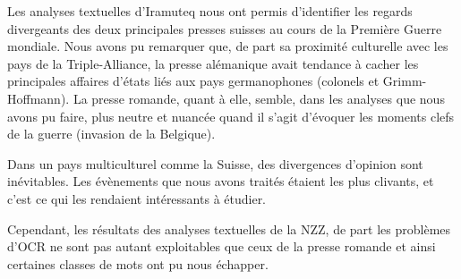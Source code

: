 \documentclass[french,a4paper]{article}
\begin{document}
Les analyses textuelles d'Iramuteq nous ont permis d'identifier les regards divergeants des deux principales presses suisses au cours de la Première Guerre mondiale.
Nous avons pu remarquer que, de part sa proximité culturelle avec les pays de la Triple-Alliance, la presse alémanique avait tendance à cacher les principales affaires d'états liés aux pays germanophones (colonels et Grimm-Hoffmann).
La presse romande, quant à elle, semble, dans les analyses que nous avons pu faire, plus neutre et nuancée quand il s'agit d'évoquer les moments clefs de la guerre (invasion de la Belgique).

Dans un pays multiculturel comme la Suisse, des divergences d'opinion sont inévitables.
Les évènements que nous avons traités étaient les plus clivants, et c'est ce qui les rendaient intéressants à étudier.

Cependant, les résultats des analyses textuelles de la NZZ, de part les problèmes d'OCR ne sont pas autant exploitables que ceux de la presse romande et ainsi certaines classes de mots ont pu nous échapper.
\end{document}

